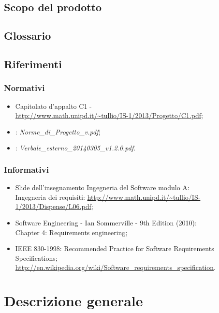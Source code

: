 \subsection{Scopo del prodotto} %
\Prodotto{}
\subsection{Glossario}%
\Glossario{}

\subsection{Riferimenti} %
\subsubsection{Normativi} %


\begin{itemize}
\item Capitolato d'appalto C1 - \Progetto{} \\
\url{http://www.math.unipd.it/~tullio/IS-1/2013/Progetto/C1.pdf};
\item {}: \emph{Norme\_{}di\_{}Progetto\_{}v\versioneNormeDiProgetto{}.pdf};\\
\item {}: \emph{Verbale\_esterno\_20140305\_v1.2.0.pdf}.
\end{itemize}

\subsubsection{Informativi} %
\begin{itemize}
\item Slide dell'insegnamento Ingegneria del Software modulo A:\\
Ingegneria dei requisiti: \url{http://www.math.unipd.it/~tullio/IS-1/2013/Dispense/L06.pdf};
\item Software Engineering - Ian Sommerville - 9th Edition (2010):\\
Chapter 4: Requirements engineering;
\item IEEE 830-1998: Recommended Practice for Software Requirements Specifications;\\
\url{http://en.wikipedia.org/wiki/Software_requirements_specification}.

\end{itemize}

\newpage
\section{Descrizione generale}%
